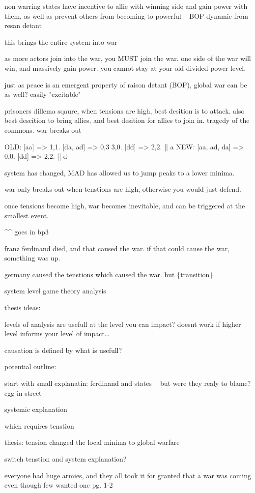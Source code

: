 \documentclass[letterpaper]{article}
\begin{document}
non warring states have incentive to allie with winning side and gain
power with them, as well as prevent others from becoming to powerful --
BOP dynamic from resan detant

this brings the entire system into war

as more actors join into the war, you MUST join the war. one side of the
war will win, and massively gain power. you cannot stay at your old
divided power level.

just as peace is an emergent property of raison detant (BOP), global war
can be as well? easily "excitable"

prisoners dillema sqaure, when tensions are high, best desition is to
attack. also best descition to bring allies, and best desition for
allies to join in. tragedy of the commons. war breaks out

OLD: [aa] => 1,1. [da, ad] => 0,3 3,0. [dd] => 2,2. || a NEW: [aa, ad,
da] => 0,0. [dd] => 2,2. || d

system has changed, MAD has allowed us to jump peaks to a lower minima.

war only breaks out when tenstions are high, otherwise you would just
defend.

once tensions become high, war becomes inevitable, and can be triggered
at the smallest event.

\^{}\^{} goes in bp3

franz ferdinand died, and that caused the war. if that could cause the
war, something was up.

germany caused the tenstions which caused the war. but \{transition\}

system level game theory analysis

thesis ideas:

levels of analysis are usefull at the level you can impact? doesnt work
if higher level informs your level of impact\ldots{}

causation is defined by what is usefull?

potential outline:

start with small explanatin: ferdinand and states || but were they realy
to blame? egg in street

systemic explanation

which requires tenstion

thesis: tension changed the local minima to global warfare

switch tenstion and system explanation?

everyone had huge armies, and they all took it for granted that a war
was coming even though few wanted one pg. 1-2
\end{document}
